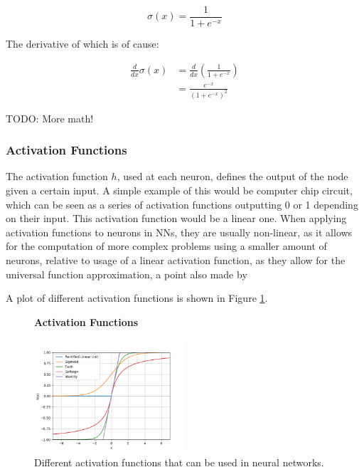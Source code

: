 $$
\sigma(x) = \frac{1}{1 + e^{-x}}
$$

The derivative of which is of cause:

\begin{align}
\frac{d}{dx}\sigma(x) &= \frac{d}{dx}(\frac{1}{1 + e^{-x}})\\
&= \frac{e^{-x}}{(1+e^{-x})^2}
\end{align}

TODO: More math!


\subsubsection{Activation Functions}
The activation function $h$, used at each neuron, defines the output of the
node given a certain input. A simple example of this would be computer chip
circuit, which can be seen as a series of activation functions outputting 0 or
1 depending on their input. This activation function would be a linear one.
When applying activation functions to neurons in \gls{NN}s, they are usually
non-linear, as it allows for the computation of more complex problems using a
smaller amount of neurons, relative to usage of a linear activation function,
as they allow for the universal function approximation, a point also made by
\cite{6797088}

A plot of different activation functions is shown in Figure
\ref{fig:activation_functions}.

\begin{figure}
    \centering
    \textbf{Activation Functions}\par\medskip
    \includegraphics[width=0.5\textwidth]{./pictures/method/activation_functions.png}
    \caption{Different activation functions that can be used in neural
        networks.}
    \label{fig:activation_functions}
\end{figure}

